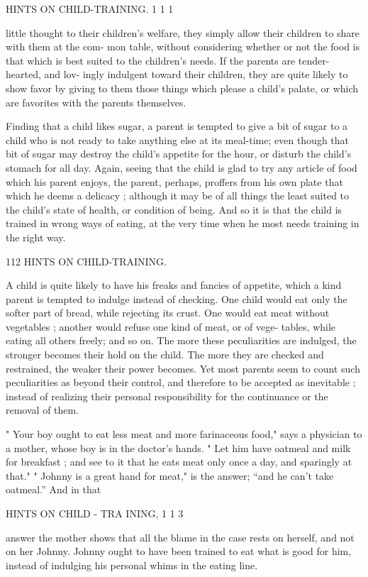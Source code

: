 \documentclass[
]{book}
\begin{document}
HINTS ON CHILD-TRAINING. 1 1 1

little thought to their children's welfare, they simply allow their children to share with them at the com- mon table, without considering whether or not the food is that which is best suited to the children's needs. If the parents are tender-hearted, and lov- ingly indulgent toward their children, they are quite likely to show favor by giving to them those things which please a child's palate, or which are favorites with the parents themselves.

Finding that a child likes sugar, a parent is tempted to give a bit of sugar to a child who is not ready to take anything else at its meal-time; even though that bit of sugar may destroy the child's appetite for the hour, or disturb the child's stomach for all day. Again, seeing that the child is glad to try any article of food which his parent enjoys, the parent, perhaps, proffers from his own plate that which he deems a delicacy ; although it may be of all things the least suited to the child's state of health, or condition of being. And so it is that the child is trained in wrong ways of eating, at the very time when he most needs training in the right way.

112 HINTS ON CHILD-TRAINING.

A child is quite likely to have his freaks and fancies of appetite, which a kind parent is tempted to indulge instead of checking. One child would eat only the softer part of bread, while rejecting its crust. One would eat meat without vegetables ; another would refuse one kind of meat, or of vege- tables, while eating all others freely; and so on. The more these peculiarities are indulged, the stronger becomes their hold on the child. The more they are checked and restrained, the weaker their power becomes. Yet most parents seem to count such peculiarities as beyond their control, and therefore to be accepted as inevitable ; instead of realizing their personal responsibility for the continuance or the removal of them.

" Your boy ought to eat less meat and more farinaceous food," says a physician to a mother, whose boy is in the doctor's hands. " Let him have oatmeal and milk for breakfast ; and see to it that he eats meat only once a day, and sparingly at that." " Johnny is a great hand for meat," is the answer; ``and he can't take oatmeal.'' And in that

HINTS ON CHILD - TRA INING, 1 1 3

answer the mother shows that all the blame in the case rests on herself, and not on her Johnny. Johnny ought to have been trained to eat what is good for him, instead of indulging his personal whims in the eating line.
\end{document}
